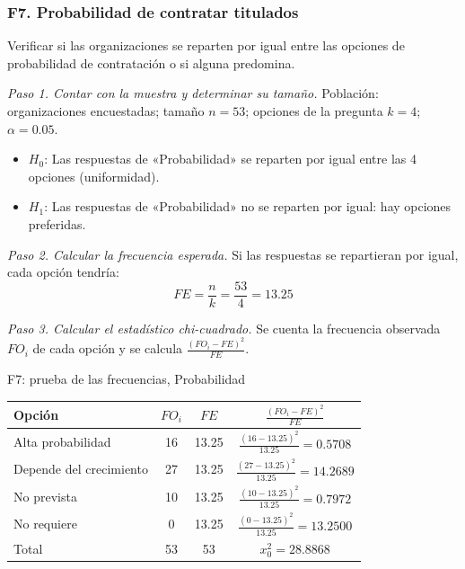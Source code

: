 \subsubsection*{F7. Probabilidad de contratar titulados}

Verificar si las organizaciones se reparten por igual entre las opciones de probabilidad de contratación o si alguna predomina.

\textit{Paso 1. Contar con la muestra y determinar su tamaño.} Población: organizaciones encuestadas; tamaño $n = 53$; opciones de la pregunta $k = 4$; $\alpha = 0.05$.

\begin{itemize}[nosep]
  \item $H_0$: Las respuestas de «Probabilidad» se reparten por igual entre las 4 opciones (uniformidad).
  \item $H_1$: Las respuestas de «Probabilidad» no se reparten por igual: hay opciones preferidas.
\end{itemize}

\textit{Paso 2. Calcular la frecuencia esperada.} Si las respuestas se repartieran por igual, cada opción tendría:
\[
FE = \frac{n}{k} = \frac{53}{4} = 13.25
\]

\textit{Paso 3. Calcular el estadístico chi-cuadrado.} Se cuenta la frecuencia observada $FO_i$ de cada opción y se calcula $\frac{(FO_i - FE)^2}{FE}$.

\begin{mitabla}{F7: prueba de las frecuencias, Probabilidad}
\begin{tabular}{L{6cm}ccc}
\toprule
Opción & $FO_i$ & $FE$ & $\frac{(FO_i-FE)^2}{FE}$ \\
\midrule
Alta probabilidad & 16 & 13.25 & $\frac{(16-13.25)^2}{13.25} = 0.5708$ \\[3pt]
Depende del crecimiento & 27 & 13.25 & $\frac{(27-13.25)^2}{13.25} = 14.2689$ \\[3pt]
No prevista & 10 & 13.25 & $\frac{(10-13.25)^2}{13.25} = 0.7972$ \\[3pt]
No requiere & 0 & 13.25 & $\frac{(0-13.25)^2}{13.25} = 13.2500$ \\[3pt]
\midrule
Total & 53 & 53 & $x_0^2 = 28.8868$ \\
\bottomrule
\end{tabular}
\end{mitabla}

